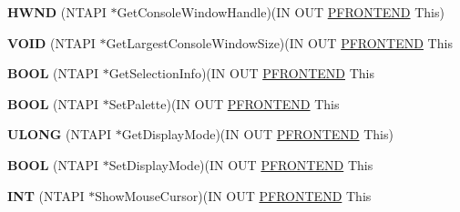 \begin{DoxyCompactItemize}
\mbox{\label{struct___f_r_o_n_t_e_n_d___v_t_b_l_af0665b68ea6cb5bd7b84091f4bce3bd8}} 
{\bfseries H\+W\+ND} (N\+T\+A\+PI $\ast$Get\+Console\+Window\+Handle)(IN O\+UT \hyperlink{struct___f_r_o_n_t_e_n_d}{P\+F\+R\+O\+N\+T\+E\+ND} This)
\item 
\mbox{\label{struct___f_r_o_n_t_e_n_d___v_t_b_l_aaa829a2fbd243ceb86f91425dcbc28e5}} 
{\bfseries V\+O\+ID} (N\+T\+A\+PI $\ast$Get\+Largest\+Console\+Window\+Size)(IN O\+UT \hyperlink{struct___f_r_o_n_t_e_n_d}{P\+F\+R\+O\+N\+T\+E\+ND} This
\item 
\mbox{\label{struct___f_r_o_n_t_e_n_d___v_t_b_l_ac12f4b3d354488dc72cd827238e645ef}} 
{\bfseries B\+O\+OL} (N\+T\+A\+PI $\ast$Get\+Selection\+Info)(IN O\+UT \hyperlink{struct___f_r_o_n_t_e_n_d}{P\+F\+R\+O\+N\+T\+E\+ND} This
\item 
\mbox{\label{struct___f_r_o_n_t_e_n_d___v_t_b_l_ae8ca14ca57deee88cbd154df22f02fe6}} 
{\bfseries B\+O\+OL} (N\+T\+A\+PI $\ast$Set\+Palette)(IN O\+UT \hyperlink{struct___f_r_o_n_t_e_n_d}{P\+F\+R\+O\+N\+T\+E\+ND} This
\item 
\mbox{\label{struct___f_r_o_n_t_e_n_d___v_t_b_l_a3c95cd222696422543a61cfc739b62e0}} 
{\bfseries U\+L\+O\+NG} (N\+T\+A\+PI $\ast$Get\+Display\+Mode)(IN O\+UT \hyperlink{struct___f_r_o_n_t_e_n_d}{P\+F\+R\+O\+N\+T\+E\+ND} This)
\item 
\mbox{\label{struct___f_r_o_n_t_e_n_d___v_t_b_l_a4c7f4a310fd8b11950bac0cdd81935f1}} 
{\bfseries B\+O\+OL} (N\+T\+A\+PI $\ast$Set\+Display\+Mode)(IN O\+UT \hyperlink{struct___f_r_o_n_t_e_n_d}{P\+F\+R\+O\+N\+T\+E\+ND} This
\item 
\mbox{\label{struct___f_r_o_n_t_e_n_d___v_t_b_l_aca7db32ccbca5520952fc817babb3129}} 
{\bfseries I\+NT} (N\+T\+A\+PI $\ast$Show\+Mouse\+Cursor)(IN O\+UT \hyperlink{struct___f_r_o_n_t_e_n_d}{P\+F\+R\+O\+N\+T\+E\+ND} This
\item 
\mbox{\label{struct___f_r_o_n_t_e_n_d___v_t_b_l_a9c3d2fad036528017b21477e0643de72}} 

\end{DoxyCompactItemize}
